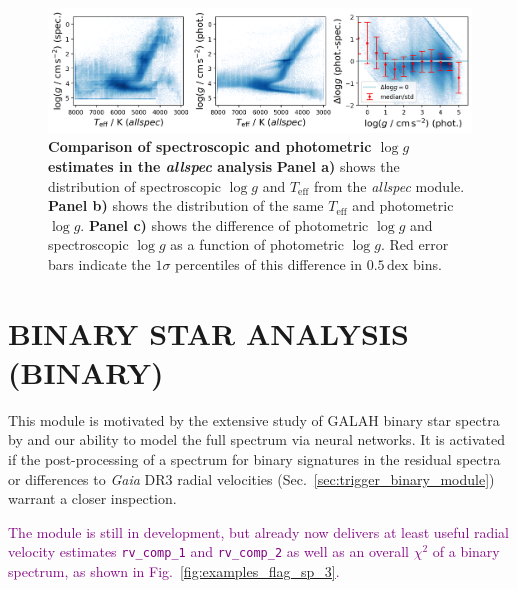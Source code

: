 \documentclass[
  journal=pasa,
  manuscript=research-paper, %
  year=2023,
  volume=37
]{cup-journal}
\newcommand{\SB}[1]{{\textcolor{purple}{#1}}}
\newcommand{\Teff}{$T_\mathrm{eff}$\xspace}
\newcommand{\logg}{$\log g$\xspace}
\newcommand{\Gaia}{\textit{Gaia}\xspace}
\begin{document}
\begin{figure}[ht]
\centering
\includegraphics[width=\textwidth]{figures/dlogg_spec_plx.png}
\caption{\textbf{Comparison of spectroscopic and photometric \logg estimates in the \textit{allspec} analysis}
\textbf{Panel a)} shows the distribution of spectroscopic \logg and \Teff from the \textit{allspec} module.
\textbf{Panel b)} shows the distribution of the same \Teff and photometric \logg.
\textbf{Panel c)} shows the difference of photometric \logg and spectroscopic \logg as a function of photometric \logg. Red error bars indicate the $1\sigma$ percentiles of this difference in $0.5\,\mathrm{dex}$ bins.} \label{fig:dlogg_spec_plx}
\end{figure}

\section{BINARY STAR ANALYSIS (BINARY)}
\label{sec:binary_analysis}


This module is motivated by the extensive study of GALAH binary star spectra by \citet{Traven2020} and our ability to model the full spectrum via neural networks. It is activated if the post-processing of a spectrum for binary signatures in the residual spectra or differences to \Gaia DR3 radial velocities (Sec.~\ref{sec:trigger_binary_module}) warrant a closer inspection.


\SB{The module is still in development, but already now delivers at least useful radial velocity estimates \texttt{rv\_comp\_1} and \texttt{rv\_comp\_2} as well as an overall $\chi^2$ of a binary spectrum, as shown in Fig.~\ref{fig:examples_flag_sp_3}.}
\end{document}
